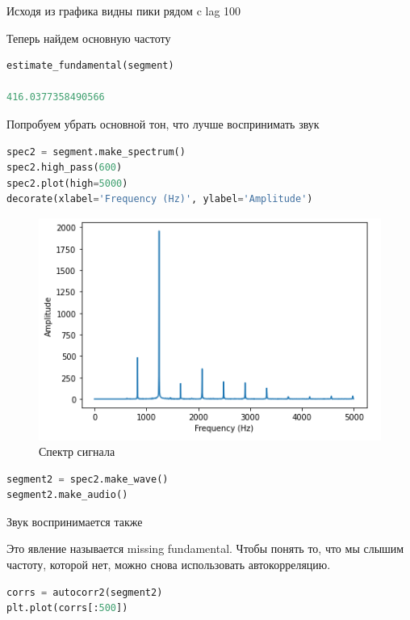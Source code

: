 Исходя из графика видны пики рядом c lag 100

Теперь найдем основную частоту

\begin{lstlisting}[language=Python]
estimate_fundamental(segment)

416.0377358490566
\end{lstlisting}

Попробуем убрать основной тон, что лучше воспринимать звук

\begin{lstlisting}[language=Python]
spec2 = segment.make_spectrum()
spec2.high_pass(600)
spec2.plot(high=5000)
decorate(xlabel='Frequency (Hz)', ylabel='Amplitude')
\end{lstlisting}

\begin{figure}[H]
	\begin{center}
		\includegraphics[scale=1]{fig/lab05/lab05_13.png}
		\caption{Спектр сигнала}
	\end{center}
\end{figure}

\begin{lstlisting}[language=Python]
segment2 = spec2.make_wave()
segment2.make_audio()
\end{lstlisting}

Звук воспринимается также

Это явление называется missing fundamental. Чтобы понять то, что мы слышим частоту, которой нет, можно снова использовать автокорреляцию.

\begin{lstlisting}[language=Python]
corrs = autocorr2(segment2)
plt.plot(corrs[:500])
\end{lstlisting}

